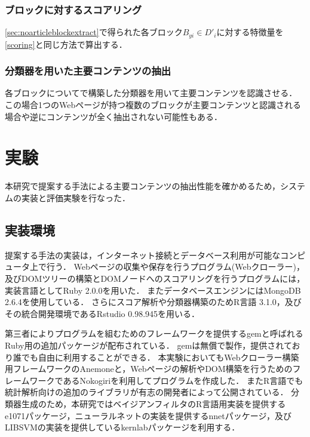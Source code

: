 \documentclass[a4paper,10pt,twocolumn]{jsarticle}
\begin{document}
\subsubsection{ブロックに対するスコアリング}

\ref{sec:noarticleblockextract}で得られた各ブロック$B_{yi} \in D'_i$に対する特徴量を\ref{scoring}と同じ方法で算出する．

\subsubsection{分類器を用いた主要コンテンツの抽出}

各ブロックについて\label{sec:constructclassifier}で構築した分類器を用いて主要コンテンツを認識させる．
この場合1つのWebページが持つ複数のブロックが主要コンテンツと認識される場合や逆にコンテンツが全く抽出されない可能性もある．

\section{実験}\label{sec:impl}

本研究で提案する手法による主要コンテンツの抽出性能を確かめるため，システムの実装と評価実験を行なった．

\subsection{実装環境}

提案する手法の実装は，インターネット接続とデータベース利用が可能なコンピュータ上で行う．
Webページの収集や保存を行うプログラム(Webクローラー)，及びDOMツリーの構築とDOMノードへのスコアリングを行うプログラムには，実装言語としてRuby 2.0.0を用いた．
またデータベースエンジンにはMongoDB 2.6.4を使用している．
さらにスコア解析や分類器構築のためR言語 3.1.0，及びその統合開発環境であるRstudio 0.98.945を用いる．

第三者によりプログラムを組むためのフレームワークを提供するgemと呼ばれるRuby用の追加パッケージが配布されている．
gemは無償で製作，提供されており誰でも自由に利用することができる．
本実験においてもWebクローラー構築用フレームワークのAnemoneと，Webページの解析やDOM構築を行うためのフレームワークであるNokogiriを利用してプログラムを作成した．
またR言語でも統計解析向けの追加のライブラリが有志の開発者によって公開されている．
分類器生成のため，本研究ではベイジアンフィルタのR言語用実装を提供するe1071パッケージ，ニューラルネットの実装を提供するnnetパッケージ，及びLIBSVMの実装を提供しているkernlabパッケージを利用する．
\end{document}

